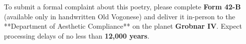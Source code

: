 \documentclass[a4paper,12pt]{article}
\begin{document}
	\noindent To submit a formal complaint about this poetry, please complete \textbf{Form 42-B} (available only in handwritten Old Vogonese) and deliver it in-person to the **Department of Aesthetic Compliance** on the planet \textbf{Grobnar IV}. Expect processing delays of no less than \textbf{12,000 years}.\\
	\vfill\newpage
	
\end{document}
